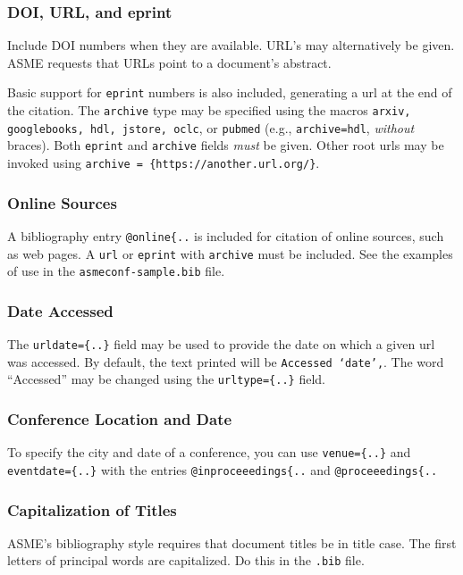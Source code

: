 \documentclass[colorlinks,upint,subscriptcorrection,varvw,balance,loadscripts,german,vietamese]{asmeconf} %
\begin{document}
\subsubsection*{DOI, URL, and eprint} Include DOI numbers when they are available.  URL's may alternatively be given. ASME requests that URLs point to a document's abstract.

Basic support for \texttt{eprint} numbers is also included, generating a url at the end of the citation. The \texttt{archive} type may be specified using the macros \texttt{arxiv, google\-books, hdl, jstore, oclc}, or \texttt{pubmed} (e.g., \texttt{archive=hdl},  \emph{without} braces). Both \texttt{eprint} and \texttt{archive} fields \emph{must} be given. Other root urls may be invoked using \verb|archive = {https://another.url.org/}|.

\subsubsection*{Online Sources} A bibliography entry \verb|@online{..| is included for citation of online sources, such as web pages. A \texttt{url} or \texttt{eprint} with \texttt{archive} must be included. See the examples of use in the \texttt{asmeconf-sample.bib} file. 

\subsubsection*{Date Accessed} The \verb|urldate={..}| field may be used to provide the date on which a given url was accessed. By default, the text printed will be \texttt{Accessed `date',}. The word ``Accessed'' may be changed using the \verb|urltype={..}| field.

\subsubsection*{Conference Location and Date} To specify the city and date of a conference, you can use \verb|venue={..}| and \verb|eventdate={..}| with the entries \verb|@inproceeedings{..| and \verb|@proceeedings{..|

\subsubsection*{Capitalization of Titles} ASME's bibliography style requires that document titles be in title case. The first letters of principal words are capitalized. Do this in the \texttt{.bib} file.
\end{document}
